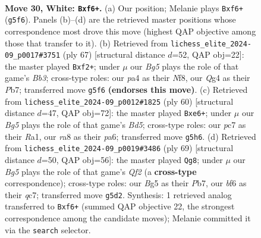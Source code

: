 \documentclass[11pt]{article}
\begin{document}
\clearpage

\begin{figure}[p]\centering
\begin{subfigure}{0.46\textwidth}\centering
\resizebox{\linewidth}{!}{%
\newchessgame
\chessboard[
  setfen={r7/2p1k1pp/3p1b2/6B1/pP4Q1/6P1/P4PKP/1q6 w - - 5 30},
  showmover=false,
  pgfstyle=straightmove, color=movearrow, markmove={g5-f6}
]}
\caption{}
\end{subfigure}\hfill
\begin{subfigure}{0.46\textwidth}\centering
\resizebox{\linewidth}{!}{%
\newchessgame
\chessboard[
  setfen={5nk1/1p1q2p1/1b4pp/3p4/8/2PQ1P1P/P1N2BP1/6K1 b - - 0 34},
  showmover=false,
  pgfstyle=straightmove, color=movearrow, markmove={b6-f2}
]}
\caption{}
\end{subfigure}
\\[4pt]
\begin{subfigure}{0.46\textwidth}\centering
\resizebox{\linewidth}{!}{%
\newchessgame
\chessboard[
  setfen={6k1/7p/p3bbp1/3Bp3/2P5/1P3P1q/P1KQ3P/R7 w - - 3 31},
  showmover=false,
  pgfstyle=straightmove, color=movearrow, markmove={d5-e6}
]}
\caption{}
\end{subfigure}\hfill
\begin{subfigure}{0.46\textwidth}\centering
\resizebox{\linewidth}{!}{%
\newchessgame
\chessboard[
  setfen={8/1pQ2qpk/2bB1p1p/8/p2P4/P4P1P/1P4PK/8 b - - 14 35},
  showmover=false,
  pgfstyle=straightmove, color=movearrow, markmove={f7-g8}
]}
\caption{}
\end{subfigure}
\caption{\textbf{Move 30, White: \texttt{Bxf6+}.} (a) Our position; Melanie plays \texttt{Bxf6+} (\texttt{g5f6}). Panels (b)--(d) are the retrieved master positions whose correspondence most drove this move (highest QAP objective among those that transfer to it). (b) Retrieved from \texttt{lichess\_elite\_2024-09\_p0017\#3751} (ply 67) [structural distance $d$=52, QAP obj=22]: the master played \texttt{Bxf2+}; under $\mu$ our \emph{Bg5} plays the role of that game's \emph{Bb3}; cross-type roles: our \emph{p}a4 as their \emph{N}f8, our \emph{Q}g4 as their \emph{P}b7; transferred move \texttt{g5f6} \textbf{(endorses this move)}. (c) Retrieved from \texttt{lichess\_elite\_2024-09\_p0012\#1825} (ply 60) [structural distance $d$=47, QAP obj=72]: the master played \texttt{Bxe6+}; under $\mu$ our \emph{Bg5} plays the role of that game's \emph{Bd5}; cross-type roles: our \emph{p}c7 as their \emph{R}a1, our \emph{r}a8 as their \emph{p}a6; transferred move \texttt{g5h6}. (d) Retrieved from \texttt{lichess\_elite\_2024-09\_p0019\#3486} (ply 69) [structural distance $d$=50, QAP obj=56]: the master played \texttt{Qg8}; under $\mu$ our \emph{Bg5} plays the role of that game's \emph{Qf2} (a \textbf{cross-type} correspondence); cross-type roles: our \emph{B}g5 as their \emph{P}b7, our \emph{b}f6 as their \emph{q}c7; transferred move \texttt{g5d2}. Synthesis: 1 retrieved analog transferred to \texttt{Bxf6+} (summed QAP objective 22, the strongest correspondence among the candidate moves); Melanie committed it via the \texttt{search} selector.}
\label{fig:thought-m58}
\end{figure}
\end{document}
